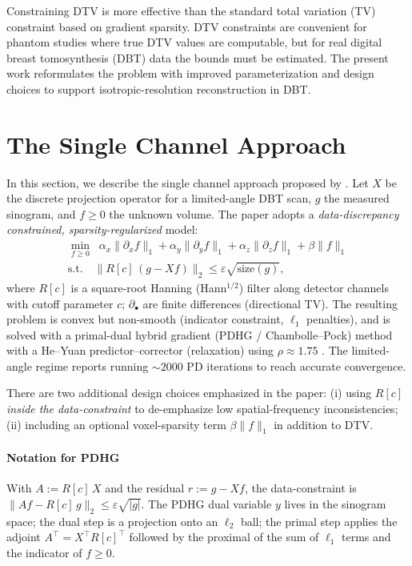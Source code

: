 \documentclass[journal, a4paper]{IEEEtran}
\begin{document}
Constraining DTV is more effective than the standard total variation (TV) constraint based on gradient sparsity. DTV constraints are convenient for phantom studies where true DTV values are computable, but for real digital breast tomosynthesis (DBT) data the bounds must be estimated. The present work reformulates the problem with improved parameterization and design choices to support isotropic-resolution reconstruction in DBT.


\section{The Single Channel Approach }
In this section, we describe the single channel approach proposed by \cite{sidky2025accurate}. Let $X$ be the discrete projection operator for a limited-angle DBT scan, $g$ the measured sinogram, and $f \ge 0$ the unknown volume. The paper adopts a \emph{data-discrepancy constrained, sparsity-regularized} model:
\begin{equation}
\label{eq:model}
\begin{split}
    \min_{f \ge 0}\;\; 
\alpha_x \|\partial_x f\|_1 + \alpha_y \|\partial_y f\|_1 + \alpha_z \|\partial_z f\|_1 + \beta \|f\|_1
\\
\text{s.t.} \quad 
\big\|R[c]\,(g - X f)\big\|_2 \le \varepsilon \sqrt{\mathrm{size}(g)},
\end{split}
\end{equation}
where $R[c]$ is a square-root Hanning (Hann$^{1/2}$) filter along detector channels with cutoff parameter $c$; $\partial_\bullet$ are finite differences (directional TV). The resulting problem is convex but non-smooth (indicator constraint, $\ell_1$ penalties), and is solved with a primal-dual hybrid gradient (PDHG / Chambolle--Pock) method with a He--Yuan predictor--corrector (relaxation) using $\rho \approx 1.75$ \cite{he2012convergence}. The limited-angle regime reports running $\sim 2000$ PD iterations to reach accurate convergence.

There are two additional design choices emphasized in the paper:
(i) using $R[c]$ \emph{inside the data-constraint} to de-emphasize low spatial-frequency inconsistencies; 
(ii) including an optional voxel-sparsity term $\beta\|f\|_1$ in addition to DTV. 

\paragraph{Notation for PDHG} With $A := R[c]\,X$ and the residual $r := g - X f$, the data-constraint is $ \|A f - R[c]\,g\|_2 \le \varepsilon\sqrt{|g|}$. The PDHG dual variable $y$ lives in the sinogram space; the dual step is a projection onto an $\ell_2$ ball; the primal step applies the adjoint $A^\top = X^\top R[c]^\top$ followed by the proximal of the sum of $\ell_1$ terms and the indicator of $f\ge 0$.
\end{document}

